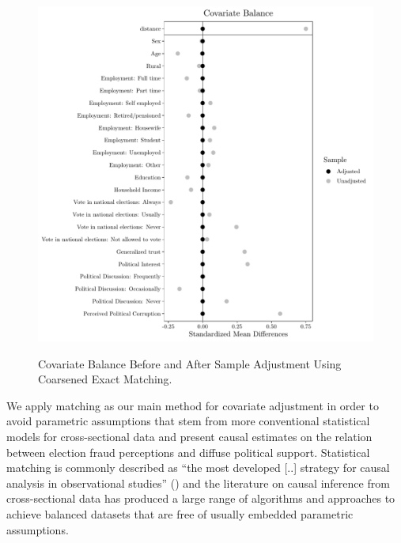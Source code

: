 \documentclass[11pt, ngerman,english,a4]{article}
\begin{document}
\begin{figure}[H]
	\caption{Covariate Balance Before and After Sample Adjustment Using Coarsened Exact Matching.}
	\centering
	\includegraphics[width=0.9\linewidth]{covbalance_cem.pdf}
	\label{fig:balance}
\end{figure}

We apply matching as our main method for covariate adjustment in order to avoid parametric assumptions that stem from more conventional statistical models for cross-sectional data and present causal estimates on the relation between election fraud perceptions and diffuse political support. Statistical matching is commonly described as “the most developed [..] strategy for causal analysis in observational studies” (\citealt{Pearl2010}) and the literature on causal inference from cross-sectional data has produced a large range of algorithms and approaches to achieve balanced datasets that are free of usually embedded  parametric assumptions. 
\end{document}
